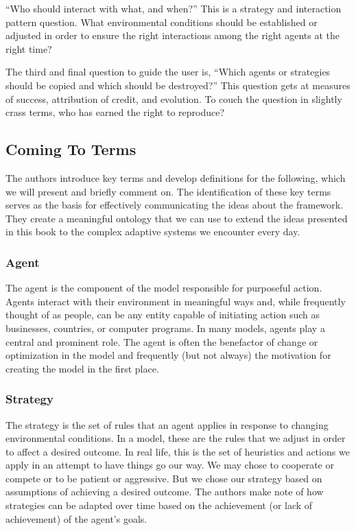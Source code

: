 \documentclass[jou,apacite]{apa6}
\begin{document}
``Who should interact with what, and when?''  This is a strategy and interaction pattern question.  What environmental conditions should be established or adjusted in order to ensure the right interactions among the right agents at the right time?

The third and final question to guide the user is, ``Which agents or strategies should be copied and which should be destroyed?''  This question gets at measures of success, attribution of credit, and evolution.  To couch the question in slightly crass terms, who has earned the right to reproduce?

\subsection{Coming To Terms}

The authors introduce key terms and develop definitions for the following, which we will present and briefly comment on.  The identification of these key terms serves as the basis for effectively communicating the ideas about the framework. They create a meaningful ontology that we can use to extend the ideas presented in this book to the complex adaptive systems we encounter every day.

\subsubsection{Agent}
The agent is the component of the model responsible for purposeful action.  Agents interact with their environment in meaningful ways and, while frequently thought of as people, can be any entity capable of initiating action such as businesses, countries, or computer programs.  In many models, agents play a central and prominent role.  The agent is often the benefactor of change or optimization in the model and frequently (but not always) the motivation for creating the model in the first place.

\subsubsection{Strategy}
The strategy is the set of rules that an agent applies in response to changing environmental conditions.  In a model, these are the rules that we adjust in order to affect a desired outcome.  In real life, this is the set of heuristics and actions we apply in an attempt to have things go our way.  We may chose to cooperate or compete or to be patient or aggressive.  But we chose our strategy based on assumptions of achieving a desired outcome.  The authors make note of how strategies can
be adapted over time based on the achievement (or lack of achievement) of the agent's goals.
\end{document}
